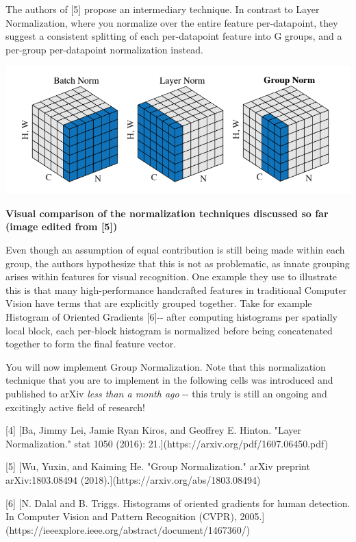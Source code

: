 \documentclass[11pt]{article}
\makeatletter
\def\maxwidth{\ifdim\Gin@nat@width>\linewidth\linewidth
    \else\Gin@nat@width\fi}
\let\Oldincludegraphics\includegraphics
\renewcommand{\includegraphics}[1]{\Oldincludegraphics[width=.8\maxwidth]{#1}}
\makeatother
\begin{document}
The authors of {[}5{]} propose an intermediary technique. In contrast to
Layer Normalization, where you normalize over the entire feature
per-datapoint, they suggest a consistent splitting of each per-datapoint
feature into G groups, and a per-group per-datapoint normalization
instead.

\includegraphics{normalization.png}

\textbf{Visual comparison of the normalization techniques discussed so
far (image edited from {[}5{]})}

Even though an assumption of equal contribution is still being made
within each group, the authors hypothesize that this is not as
problematic, as innate grouping arises within features for visual
recognition. One example they use to illustrate this is that many
high-performance handcrafted features in traditional Computer Vision
have terms that are explicitly grouped together. Take for example
Histogram of Oriented Gradients {[}6{]}-\/- after computing histograms
per spatially local block, each per-block histogram is normalized before
being concatenated together to form the final feature vector.

You will now implement Group Normalization. Note that this normalization
technique that you are to implement in the following cells was
introduced and published to arXiv \emph{less than a month ago} -\/- this
truly is still an ongoing and excitingly active field of research!

{[}4{]} {[}Ba, Jimmy Lei, Jamie Ryan Kiros, and Geoffrey E. Hinton.
"Layer Normalization." stat 1050 (2016):
21.{]}(https://arxiv.org/pdf/1607.06450.pdf)

{[}5{]} {[}Wu, Yuxin, and Kaiming He. "Group Normalization." arXiv
preprint arXiv:1803.08494 (2018).{]}(https://arxiv.org/abs/1803.08494)

{[}6{]} {[}N. Dalal and B. Triggs. Histograms of oriented gradients for
human detection. In Computer Vision and Pattern Recognition (CVPR),
2005.{]}(https://ieeexplore.ieee.org/abstract/document/1467360/)
\end{document}
